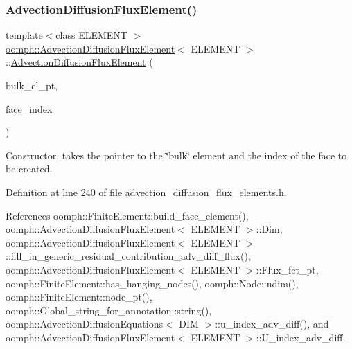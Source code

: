 \subsubsection{\texorpdfstring{Advection\+Diffusion\+Flux\+Element()}{AdvectionDiffusionFluxElement()}\hspace{0.1cm}{\footnotesize\ttfamily [1/3]}}
{\footnotesize\ttfamily template$<$class E\+L\+E\+M\+E\+NT $>$ \\
\hyperlink{classoomph_1_1AdvectionDiffusionFluxElement}{oomph\+::\+Advection\+Diffusion\+Flux\+Element}$<$ E\+L\+E\+M\+E\+NT $>$\+::\hyperlink{classoomph_1_1AdvectionDiffusionFluxElement}{Advection\+Diffusion\+Flux\+Element} (\begin{DoxyParamCaption}\item[{\hyperlink{classoomph_1_1FiniteElement}{Finite\+Element} $\ast$const \&}]{bulk\+\_\+el\+\_\+pt,  }\item[{const int \&}]{face\+\_\+index }\end{DoxyParamCaption})}



Constructor, takes the pointer to the \char`\"{}bulk\char`\"{} element and the index of the face to be created. 



Definition at line 240 of file advection\+\_\+diffusion\+\_\+flux\+\_\+elements.\+h.



References oomph\+::\+Finite\+Element\+::build\+\_\+face\+\_\+element(), oomph\+::\+Advection\+Diffusion\+Flux\+Element$<$ E\+L\+E\+M\+E\+N\+T $>$\+::\+Dim, oomph\+::\+Advection\+Diffusion\+Flux\+Element$<$ E\+L\+E\+M\+E\+N\+T $>$\+::fill\+\_\+in\+\_\+generic\+\_\+residual\+\_\+contribution\+\_\+adv\+\_\+diff\+\_\+flux(), oomph\+::\+Advection\+Diffusion\+Flux\+Element$<$ E\+L\+E\+M\+E\+N\+T $>$\+::\+Flux\+\_\+fct\+\_\+pt, oomph\+::\+Finite\+Element\+::has\+\_\+hanging\+\_\+nodes(), oomph\+::\+Node\+::ndim(), oomph\+::\+Finite\+Element\+::node\+\_\+pt(), oomph\+::\+Global\+\_\+string\+\_\+for\+\_\+annotation\+::string(), oomph\+::\+Advection\+Diffusion\+Equations$<$ D\+I\+M $>$\+::u\+\_\+index\+\_\+adv\+\_\+diff(), and oomph\+::\+Advection\+Diffusion\+Flux\+Element$<$ E\+L\+E\+M\+E\+N\+T $>$\+::\+U\+\_\+index\+\_\+adv\+\_\+diff.

\mbox{\label{classoomph_1_1AdvectionDiffusionFluxElement_af91991cc6e255d038f0f8443e0339643}} 
